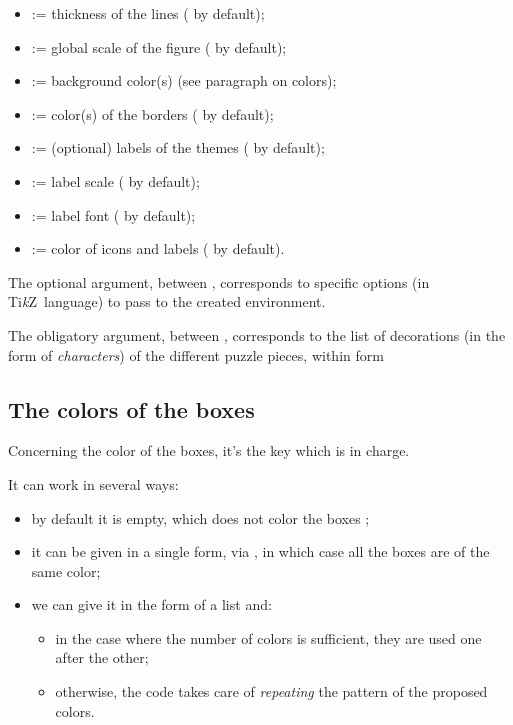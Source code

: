 \documentclass[11pt,a4paper]{ltxdoc}
\providecommand\tikzlogo{Ti\textit{k}Z}
\let\TikZ\tikzlogo
\begin{document}
\begin{itemize}
	\item {} := thickness of the lines (\MontreCode{1pt} by default);
	\item {} := global scale of the figure ( by default);
	\item {} := background color(s) (see paragraph on colors);
	\item {} := color(s) of the borders ( by default);
	\item {} := (optional) labels of the themes (\MontreCode{\{\}} by default);
	\item {} := label scale ( by default);
	\item {} := label font ( by default);
	\item {} := color of icons and labels ( by default).
\end{itemize}

\medskip

The optional argument, between , corresponds to specific options (in \TikZ\ language) to pass to the created environment.

\smallskip

The obligatory argument, between , corresponds to the list of decorations (in the form of \textit{characters}) of the different puzzle pieces, within form 

\subsection{The colors of the boxes}

Concerning the color of the boxes, it's the key  which is in charge.

It can work in several ways:

\begin{itemize}
	\item by default it is empty, which does not color the boxes ;
	\item it can be given in a single form, via , in which case all the boxes are of the same color;
	\item we can give it in the form of a list  and:
	\begin{itemize}
		\item in the case where the number of colors is sufficient, they are used one after the other;
		\item otherwise, the code takes care of \textit{repeating} the pattern of the proposed colors.
	\end{itemize}
\end{itemize}
\end{document}
